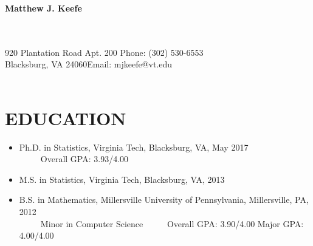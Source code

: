 \documentclass[10pt]{article}
\begin{document}
\begin{center}
{\Large{\bf{Matthew J. Keefe}}}\\
\end{center}
\underline{\hspace{7.3in}}\\
~~\\
920 Plantation Road Apt. 200 \hfill Phone: (302) 530-6553\\
Blacksburg, VA 24060\hfill Email: mjkeefe@vt.edu\\
\underline{\hspace{7.3in}}\\
\section*{EDUCATION}

\begin{itemize}
\item[] {Ph.D.} in Statistics,  Virginia Tech, Blacksburg, VA, May 2017 \\
\mbox{~~~~~}Overall GPA: 3.93/4.00 
\item[] {M.S.} in Statistics, Virginia Tech, Blacksburg, VA, 2013
\item[] { B.S.} in Mathematics, Millersville University of Pennsylvania, Millersville, PA, 2012\\
\mbox{~~~~~}Minor in Computer Science
\mbox{~~~~~}Overall GPA: 3.90/4.00 \hspace{12pt} Major GPA: 4.00/4.00 
\end{itemize}
%
\end{document}
